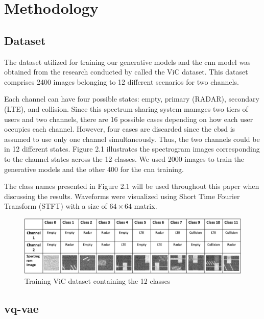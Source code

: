 \chapter{Methodology}
\label{chap:methods}

\section{Dataset}

The dataset utilized for training our generative models and the \gls{cnn} model was obtained from the research conducted by \cite{5} called the ViC dataset. This dataset comprises 2400 images belonging to 12 different scenarios for two channels. 

Each channel can have four possible states: empty, primary (RADAR), secondary (LTE), and collision. Since this spectrum-sharing system manages two tiers of users and two channels, there are 16 possible cases depending on how each user occupies each channel. However, four cases are discarded since the  \gls{cbsd} is assumed to use only one channel simultaneously. Thus, the two channels could be in 12 different states. Figure 2.1 illustrates the spectrogram images corresponding to the channel states across the 12 classes. We used 2000 images to train the generative models and the other 400 for the \gls{cnn} training. 

The class names presented in Figure 2.1 will be used throughout this paper when discussing the results. Waveforms were visualized using  Short Time Fourier Transform (STFT) with a size of $64 \times 64 $ matrix.

\begin{figure}[h]
\includegraphics[width=\textwidth]{figures/classes_white_background.png}
\centering
\caption{Training ViC dataset containing the 12 classes \cite{5}}
\label{fig:training-dataset}
\centering
\end{figure}
\section{\gls{vq-vae}}

